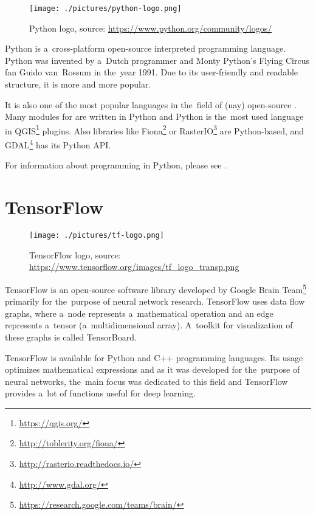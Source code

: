 \begin{figure}[H]
   \centering
	\texttt{[image: ./pictures/python-logo.png]}
	\caption[Python logo]{Python logo, source: \url{https://www.python.org/community/logos/}}
      \label{fig:python-logo}
\end{figure}

Python is a~cross-platform open-source interpreted programming language. Python 
was invented by a~Dutch programmer and Monty Python's Flying Circus fan Guido 
van~Rossum in the~year 1991. Due to its user-friendly and readable structure, it is 
more and more popular.

It is also one of the most popular languages in the~field of (nay) open-source
. Many modules for   are written in Python and Python
is the~most used language
in QGIS\footnote{\url{https://qgis.org/}} plugins. Also libraries like
Fiona\footnote{\url{http://toblerity.org/fiona/}} or
RasterIO\footnote{\url{http://rasterio.readthedocs.io/}} are Python-based, and
GDAL\footnote{\url{http://www.gdal.org/}} has its Python API.

For information about programming in Python, please see \cite{diveintopython}.

\section{TensorFlow}
\label{tf}

\begin{figure}[h]
   \centering
	\texttt{[image: ./pictures/tf-logo.png]}
	\caption[TensorFlow logo]{TensorFlow logo, source: \url{https://www.tensorflow.org/images/tf_logo_transp.png}}
      \label{fig:tf-logo}
\end{figure}

TensorFlow is an open-source software library developed by Google Brain 
Team\footnote{\url{https://research.google.com/teams/brain/}} primarily for
the~purpose of neural network research. TensorFlow uses data flow graphs, where
a~node represents a~mathematical operation and an edge represents a~tensor
(a~multidimensional array). A~toolkit for visualization of these graphs is called 
TensorBoard.

TensorFlow is available for Python and C++ programming languages. Its usage 
optimizes mathematical expressions and as it was developed for the~purpose of 
neural networks, the~main focus was dedicated to this field and TensorFlow 
provides a~lot of functions useful for deep learning.

